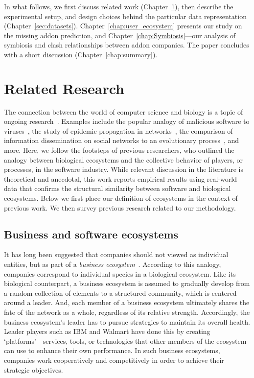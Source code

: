 \documentclass[ijoc,nonblindrev]{informs3} %
\numberwithin{equation}{subsection}
\begin{document}
In what follows, we first discuss related work (Chapter~\ref{sec:related}), then describe the experimental setup, and design choices behind the particular data representation (Chapter~\ref{sec:datasets}). Chapter~\ref{chap:user_ecosystem} presents our study on the missing addon prediction, and Chapter~\ref{chap:Symbiosis}---our analysis of symbiosis and clash relationships between addon companies. The paper concludes with a short discussion (Chapter~\ref{chap:summary}).

\section{Related Research}
\label{sec:related}

The connection between the world of computer science and biology is a topic of ongoing research~\citep{rasmus2015computational}. Examples include the popular analogy of malicious software to viruses~\citep{cohen1987computer}, the study of epidemic propagation in networks~\citep{christosKAIS14}, the comparison of information dissemination on social networks to an evolutionary process~\citep{adamicWSDM16}, and more. Here, we follow the footsteps of previous researchers, who outlined the analogy between biological ecosystems and the collective behavior of players, or processes, in the software industry. While relevant discussion in the literature is theoretical and anecdotal, this work reports empirical results using real-world data that confirms the structural similarity between software and biological ecosystems. Below we first place our definition of ecosystems in the context of previous work. We then survey previous research related to our methodology.

\subsection{Business and software ecosystems}
\label{sec:bio_ecosystem}

It has long been suggested that companies should not viewed as individual entities, but as part of a {\it business ecosystem}~\citep{moore93,iansiti04}. According to this analogy, companies correspond to individual species in a biological ecosystem. Like its biological counterpart, a business ecosystem is assumed to gradually develop from a random collection of elements to a structured community, which is centered around a leader. And, each member of a business ecosystem ultimately shares the fate of the network as a whole, regardless of its relative strength. Accordingly, the business ecosystem's leader has to pursue strategies to maintain its overall health. Leader players such as IBM and Walmart have done this by creating `platforms'---services, tools, or technologies that other members of the ecosystem can use to enhance their own performance. In such business ecosystems, companies work cooperatively and competitively in order to achieve their strategic objectives. 
\end{document}
